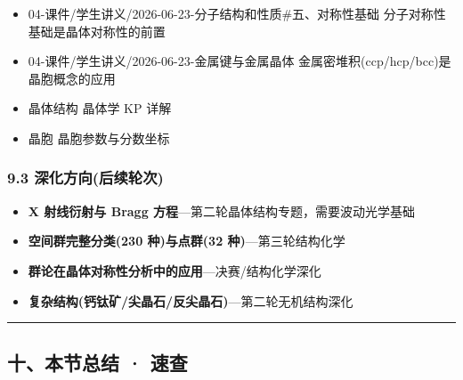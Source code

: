 \begin{itemize}
\tightlist
\item
  04-课件/学生讲义/2026-06-23-分子结构和性质\#五、对称性基础 \箭 分子对称性基础是晶体对称性的前置
\item
  04-课件/学生讲义/2026-06-23-金属键与金属晶体 \箭 金属密堆积(ccp/hcp/bcc)是晶胞概念的应用
\item
  晶体结构 \箭 晶体学 KP 详解
\item
  晶胞 \箭 晶胞参数与分数坐标
\end{itemize}

\subsubsection{9.3 深化方向(后续轮次)}\label{ux6df1ux5316ux65b9ux5411ux540eux7eedux8f6eux6b21}

\begin{itemize}
\tightlist
\item
  \textbf{X 射线衍射与 Bragg 方程}---第二轮晶体结构专题，需要波动光学基础
\item
  \textbf{空间群完整分类(230 种)与点群(32 种)}---第三轮结构化学
\item
  \textbf{群论在晶体对称性分析中的应用}---决赛/结构化学深化
\item
  \textbf{复杂结构(钙钛矿/尖晶石/反尖晶石)}---第二轮无机结构深化
\end{itemize}

\begin{center}\rule{0.5\linewidth}{0.5pt}\end{center}

\subsection{十、本节总结 · 速查}\label{ux5341ux672cux8282ux603bux7ed3-ux901fux67e5}

